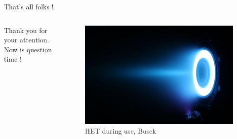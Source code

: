 \documentclass[sans, aspectratio=169]{beamer}
\begin{document}
\begin{frame}{That's all folks !}

	\begin{columns}

		\begin{column}{0.55\linewidth}
			\begin{center}
				Thank you for your attention.\\
				\vspace{1cm}
				Now is question time !
			\end{center}
		\end{column}
	
		\begin{column}{0.45\linewidth}
			\begin{figure}[hbtp]
				\centering
				\includegraphics[scale=0.3]{images/HET_firing.jpg} 
				\caption{HET during use, Busek}
			\end{figure}
		\end{column}


	\end{columns}
	

\end{frame}	

\end{document}
